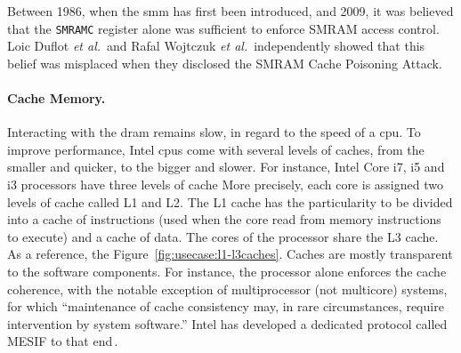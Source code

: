 Between 1986, when the \ac{smm} has first been introduced, and 2009, it was
believed that the \texttt{SMRAMC} register alone was sufficient to enforce SMRAM
access control.
%
Loic Duflot \emph{et al.}\,\cite{duflot2009smram} and Rafal Wojtczuk \emph{et
  al.}\,\cite{wojtczuk2009smram} independently showed that this belief was
misplaced when they disclosed the SMRAM Cache Poisoning Attack.

\paragraph{Cache Memory.}
%
Interacting with the \ac{dram} remains slow, in regard to the speed of a
\ac{cpu}.
%
To improve performance, Intel \acp{cpu} come with several levels of caches, from
the smaller and quicker, to the bigger and slower.
%
For instance, Intel Core i7, i5 and i3 processors have three levels of cache
%
More precisely, each core is assigned two levels of cache called L1 and L2.
%
The L1 cache has the particularity to be divided into a cache of instructions
(used when the core read from memory instructions to execute) and a cache of
data.
%
The cores of the processor share the L3 cache.
%
As a reference, the Figure~\ref{fig:usecase:l1-l3caches}.
%
Caches are mostly transparent to the software components.
%
For instance, the processor alone enforces the cache coherence, with the notable
exception of multiprocessor (not multicore) systems, for which ``maintenance of
cache consistency may, in rare circumstances, require intervention by system
software.''
%
Intel has developed a dedicated protocol called MESIF to that
end\,\cite{thomadakis2011nehalem}.


